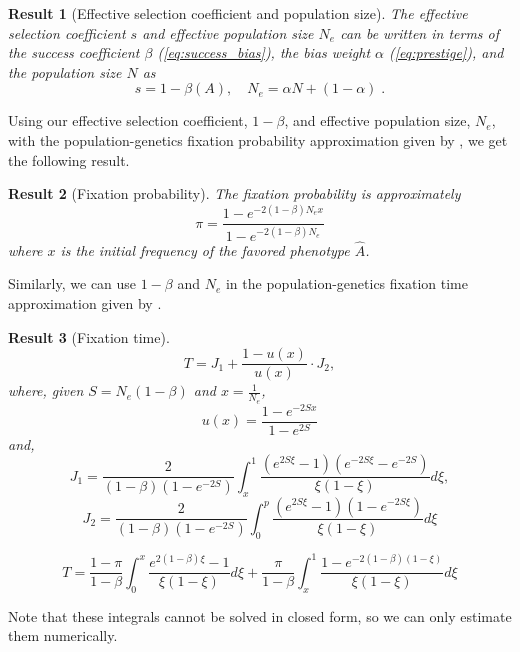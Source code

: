\documentclass[12pt]{extarticle}
\newtheorem{result}{Result}
\begin{document}
\begin{result}[Effective selection coefficient and population size]\label{res:selection_coef}
The effective selection coefficient $s$ and effective population size $N_e$ can be written in terms of the success coefficient $\beta$ (\cref{eq:success_bias}), the bias weight $\alpha$ (\cref{eq:prestige}), and the population size $N$ as 
\begin{equation}
s=1-\beta(A), \quad N_e=\alpha N + (1-\alpha) \;.
\end{equation}
\end{result}

Using our effective selection coefficient, $1-\beta$, and effective population size, $N_e$, with the population-genetics fixation probability approximation given by \citet[eq.~8]{kimura}, we get the following result.\\

\begin{result}[Fixation probability]
The fixation probability is approximately
\begin{equation}\label{eq:kimura_p}
\pi = \frac{1-e^{-2(1-\beta)N_e x}}{1-e^{-2(1-\beta)N_e}}
\end{equation}
where $x$ is the initial frequency of the favored phenotype $\hat{A}$.
\end{result}

Similarly, we can use $1-\beta$ and $N_e$ in the population-genetics fixation time approximation given by \citet[eq.~17]{kimura_average}.\\


\begin{result}[Fixation time]
\begin{equation}
T = J_1 + \frac{1-u(x)}{u(x)}\cdot J_2,
\end{equation}
where, given $S=N_e(1-\beta)$ and $x=\frac{1}{N_e}$,
\begin{equation}
u(x)=\frac{1-e^{-2Sx}}{1-e^{2S}}
\end{equation}
and,
\begin{equation}
J_1 = \frac{2}{(1-\beta)(1-e^{-2S})}\int_x^1 \frac{(e^{2S\xi}-1)(e^{-2S\xi}-e^{-2S})}{\xi(1-\xi)}d\xi,
\end{equation}
\begin{equation}
J_2= \frac{2}{(1-\beta)(1-e^{-2S})}\int_0^p \frac{(e^{2S\xi}-1)(1-e^{-2S\xi})}{\xi(1-\xi)}d\xi
\end{equation}

\begin{equation}\label{eq:kimura_t}
T = \frac{1-\pi}{1-\beta}\int_0^x\frac{e^{2(1-\beta) \xi}-1}{\xi(1-\xi)}d\xi+ \frac{\pi}{1-\beta}\int_x^1\frac{1-e^{-2(1-\beta)(1-\xi)}}{\xi(1-\xi)}d\xi
\end{equation}
\end{result}
Note that these integrals cannot be solved in closed form, so we can only estimate them numerically.
\end{document}

